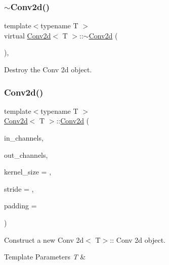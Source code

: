 \subsubsection{\texorpdfstring{$\sim$Conv2d()}{~Conv2d()}}
{\footnotesize\ttfamily template$<$typename T $>$ \\
virtual \mbox{\hyperlink{class_conv2d}{Conv2d}}$<$ T $>$\+::$\sim$\mbox{\hyperlink{class_conv2d}{Conv2d}} (\begin{DoxyParamCaption}{ }\end{DoxyParamCaption})\hspace{0.3cm}{\ttfamily [virtual]}, {\ttfamily [default]}}



Destroy the Conv 2d object. 

\mbox{\label{class_conv2d_a5676e8e1db6826703489568ff32c1436}} 
\subsubsection{\texorpdfstring{Conv2d()}{Conv2d()}\hspace{0.1cm}{\footnotesize\ttfamily [2/2]}}
{\footnotesize\ttfamily template$<$typename T $>$ \\
\mbox{\hyperlink{class_conv2d}{Conv2d}}$<$ T $>$\+::\mbox{\hyperlink{class_conv2d}{Conv2d}} (\begin{DoxyParamCaption}\item[{size\+\_\+t}]{in\+\_\+channels,  }\item[{size\+\_\+t}]{out\+\_\+channels,  }\item[{size\+\_\+t}]{kernel\+\_\+size = {},  }\item[{size\+\_\+t}]{stride = {},  }\item[{size\+\_\+t}]{padding = {} }\end{DoxyParamCaption})}



Construct a new Conv 2d$<$ T$>$\+:: Conv 2d object. 


\begin{DoxyTemplParams}{Template Parameters}
{\em T} & \\
\hline
\end{DoxyTemplParams}

